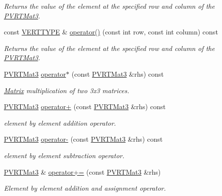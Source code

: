 \begin{DoxyCompactItemize}
\begin{DoxyCompactList}\small\item\em Returns the value of the element at the specified row and column of the \hyperlink{struct_p_v_r_t_mat3}{P\+V\+R\+T\+Mat3}. \end{DoxyCompactList}\item 
const \hyperlink{group___a_p_i___o_g_l_e_s_ga06da457b7d3e93368ab904f89e1396be}{V\+E\+R\+T\+T\+Y\+P\+E} \& \hyperlink{struct_p_v_r_t_mat3_a7ede9f1ab8f4260bff096096d335b484}{operator()} (const int row, const int column) const 
\begin{DoxyCompactList}\small\item\em Returns the value of the element at the specified row and column of the \hyperlink{struct_p_v_r_t_mat3}{P\+V\+R\+T\+Mat3}. \end{DoxyCompactList}\item 
\hyperlink{struct_p_v_r_t_mat3}{P\+V\+R\+T\+Mat3} \hyperlink{struct_p_v_r_t_mat3_ae49d94c46129a03c8aefe54eb10828d7}{operator$\ast$} (const \hyperlink{struct_p_v_r_t_mat3}{P\+V\+R\+T\+Mat3} \&rhs) const 
\begin{DoxyCompactList}\small\item\em \hyperlink{class_matrix}{Matrix} multiplication of two 3x3 matrices. \end{DoxyCompactList}\item 
\hyperlink{struct_p_v_r_t_mat3}{P\+V\+R\+T\+Mat3} \hyperlink{struct_p_v_r_t_mat3_a744d08ca9504773e64a725e826bea6e5}{operator+} (const \hyperlink{struct_p_v_r_t_mat3}{P\+V\+R\+T\+Mat3} \&rhs) const 
\begin{DoxyCompactList}\small\item\em element by element addition operator. \end{DoxyCompactList}\item 
\hyperlink{struct_p_v_r_t_mat3}{P\+V\+R\+T\+Mat3} \hyperlink{struct_p_v_r_t_mat3_a2d2e94d2acddf9f1d4f593241562dd30}{operator-\/} (const \hyperlink{struct_p_v_r_t_mat3}{P\+V\+R\+T\+Mat3} \&rhs) const 
\begin{DoxyCompactList}\small\item\em element by element subtraction operator. \end{DoxyCompactList}\item 
\hyperlink{struct_p_v_r_t_mat3}{P\+V\+R\+T\+Mat3} \& \hyperlink{struct_p_v_r_t_mat3_a6859b84527d76017a1f2bed4788680e7}{operator+=} (const \hyperlink{struct_p_v_r_t_mat3}{P\+V\+R\+T\+Mat3} \&rhs)
\begin{DoxyCompactList}\small\item\em Element by element addition and assignment operator. \end{DoxyCompactList}\item 

\end{DoxyCompactItemize}
